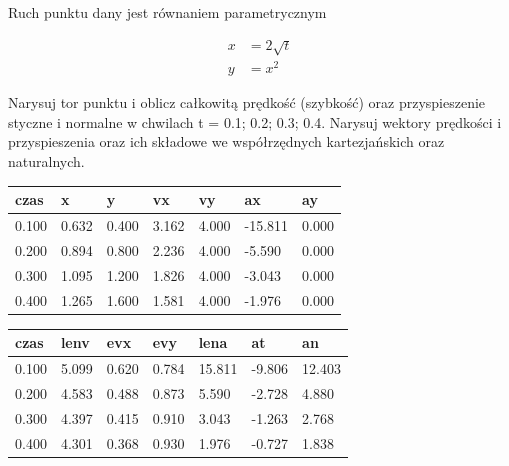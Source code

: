         Ruch punktu dany jest równaniem parametrycznym
        
        \begin{align*}
            x &= 2 \sqrt{t} \\
            y &= x^2
        \end{align*}
        
        Narysuj tor punktu i oblicz całkowitą prędkość (szybkość) oraz przyspieszenie styczne i normalne w chwilach t = { 0.1; 0.2; 0.3; 0.4}. Narysuj wektory prędkości i przyspieszenia oraz ich składowe we współrzędnych kartezjańskich oraz naturalnych.
    
        \begin{table}[H] \small
        \begin{tabular}{lllllll} \hline
        czas  & x     & y     & vx    & vy    & ax      & ay    \\ \hline
        0.100 & 0.632 & 0.400 & 3.162 & 4.000 & -15.811 & 0.000 \\
        0.200 & 0.894 & 0.800 & 2.236 & 4.000 & -5.590  & 0.000 \\
        0.300 & 1.095 & 1.200 & 1.826 & 4.000 & -3.043  & 0.000 \\
        0.400 & 1.265 & 1.600 & 1.581 & 4.000 & -1.976  & 0.000 \\ \hline
        \end{tabular}
        \end{table}
        
        \begin{table}[H] \small
        \begin{tabular}{lllllll} \hline
        czas  & lenv  & evx   & evy   & lena   & at     & an     \\ \hline
        0.100 & 5.099 & 0.620 & 0.784 & 15.811 & -9.806 & 12.403 \\
        0.200 & 4.583 & 0.488 & 0.873 & 5.590  & -2.728 & 4.880  \\
        0.300 & 4.397 & 0.415 & 0.910 & 3.043  & -1.263 & 2.768  \\
        0.400 & 4.301 & 0.368 & 0.930 & 1.976  & -0.727 & 1.838  \\ \hline
        \end{tabular}
        \end{table}